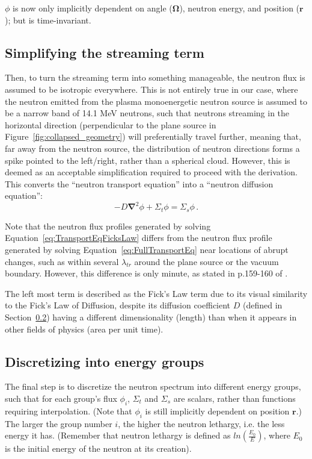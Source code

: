 \documentclass[a4paper, 12pt]{article}
\begin{document}
$\phi$ is now only implicitly dependent on angle ($\boldsymbol{\Omega}$), neutron energy, and position ($\boldsymbol{r}$); but is time-invariant.

\subsection{Simplifying the streaming term}
Then, to turn the streaming term into something manageable, the neutron flux is assumed to be isotropic everywhere.
This is not entirely true in our case, where the neutron emitted from the plasma monoenergetic neutron source is assumed to be a narrow band of 14.1 MeV neutrons, such that neutrons streaming in the horizontal direction (perpendicular to the plane source in Figure~\ref{fig:collapsed_geometry}) will preferentially travel further, meaning that, far away from the neutron source, the distribution of neutron directions forms a spike pointed to the left/right, rather than a spherical cloud. However, this is deemed as an acceptable simplification required to proceed with the derivation.
This converts the ``neutron transport equation'' into a ``neutron diffusion equation'':
\begin{equation}\label{eq:TransportEqFicksLaw}
    -D\boldsymbol{\nabla}^2\phi + \Sigma_t \phi =\Sigma_s \phi\,.
\end{equation}

Note that the neutron flux profiles generated by solving Equation~\ref{eq:TransportEqFicksLaw} differs from the neutron flux profile generated by solving Equation~\ref{eq:FullTransportEq} near locations of abrupt changes, such as within several $\lambda_{tr}$ around the plane source or the vacuum boundary. However, this difference is only minute, as stated in p.159-160 of \cite{Duderstadt}.

The left most term is described as the Fick's Law term due to its visual similarity to the Fick's Law of Diffusion, despite its diffusion coefficient $D$ (defined in Section~\ref{sec:discretize}) having a different dimensionality (length) than when it appears in other fields of physics (area per unit time).

\subsection{Discretizing into energy groups}\label{sec:discretize}
The final step is to discretize the neutron spectrum into different energy groups, such that for each group's flux $\phi_i$, $\Sigma_t$ and $\Sigma_s$ are scalars, rather than functions requiring interpolation. (Note that $\phi_i$ is still implicitly dependent on position $\boldsymbol{r}$.) The larger the group number $i$, the higher the neutron lethargy, i.e. the less energy it has. (Remember that neutron lethargy is defined as $ln(\frac{E_0}{E})$, where $E_0$ is the initial energy of the neutron at its creation).
\end{document}
